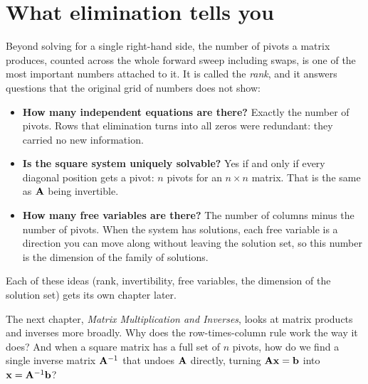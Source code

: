 \section{What elimination tells you}

Beyond solving for a single right-hand side, the number of pivots a matrix produces,
counted across the whole forward sweep including swaps, is one of the most important
numbers attached to it. It is called the \emph{rank}, and it answers questions
that the original grid of numbers does not show:

\begin{itemize}
  \item \textbf{How many independent equations are there?} Exactly the
  number of pivots. Rows that elimination turns into all zeros were redundant: they
  carried no new information.
  \item \textbf{Is the square system uniquely solvable?} Yes if and only if
  every diagonal position gets a pivot: $n$ pivots for an $n\times n$ matrix.
  That is the same as $\mathbf{A}$ being invertible.
  \item \textbf{How many free variables are there?} The number of columns minus
  the number of pivots. When the system has solutions, each free variable is a
  direction you can move along without leaving the solution set, so this number
  is the dimension of the family of solutions.
\end{itemize}

Each of these ideas (rank, invertibility, free variables, the dimension of
the solution set) gets its own chapter later.

The next chapter, \emph{Matrix Multiplication and Inverses}, looks at matrix
products and inverses more broadly. Why does the row-times-column rule work the
way it does? And when a square matrix has a
full set of $n$ pivots, how do we find a single inverse matrix $\mathbf{A}^{-1}$ that
undoes $\mathbf{A}$ directly, turning $\mathbf{A}\mathbf{x}=\mathbf{b}$ into
$\mathbf{x}=\mathbf{A}^{-1}\mathbf{b}$?

